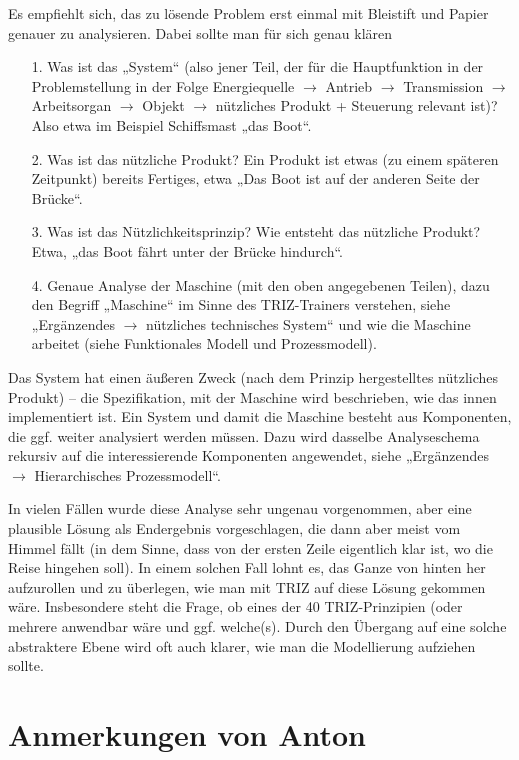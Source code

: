 \documentclass[11pt,a4paper]{article}
\begin{document}
Es empfiehlt sich, das zu lösende Problem erst einmal mit Bleistift und Papier
genauer zu analysieren. Dabei sollte man für sich genau klären
\begin{itemize}
\item[1.] Was ist das „System“ (also jener Teil, der für die Hauptfunktion in
  der Problemstellung in der Folge Energiequelle $\to$ Antrieb $\to$
  Transmission $\to$ Arbeitsorgan $\to$ Objekt $\to$ nützliches Produkt +
  Steuerung relevant ist)? Also etwa im Beispiel Schiffsmast „das Boot“.

\item[2.] Was ist das nützliche Produkt? Ein Produkt ist etwas (zu einem
  späteren Zeitpunkt) bereits Fertiges, etwa „Das Boot ist auf der anderen
  Seite der Brücke“.

\item[3.] Was ist das Nützlichkeitsprinzip? Wie entsteht das nützliche
  Produkt? Etwa, „das Boot fährt unter der Brücke hindurch“.

\item[4.] Genaue Analyse der Maschine (mit den oben angegebenen Teilen), dazu
  den Begriff „Maschine“ im Sinne des TRIZ-Trainers verstehen, siehe
  „Ergänzendes $\to$ nützliches technisches System“ und wie die Maschine
  arbeitet (siehe Funktionales Modell und Prozessmodell).
\end{itemize}
Das System hat einen äußeren Zweck (nach dem Prinzip hergestelltes nützliches
Produkt) -- die Spezifikation, mit der Maschine wird beschrieben, wie das
innen implementiert ist. Ein System und damit die Maschine besteht aus
Komponenten, die ggf. weiter analysiert werden müssen. Dazu wird dasselbe
Analyseschema rekursiv auf die interessierende Komponenten angewendet, siehe
„Ergänzendes $\to$ Hierarchisches Prozessmodell“.

In vielen Fällen wurde diese Analyse sehr ungenau vorgenommen, aber eine
plausible Lösung als Endergebnis vorgeschlagen, die dann aber meist vom Himmel
fällt (in dem Sinne, dass von der ersten Zeile eigentlich klar ist, wo die
Reise hingehen soll). In einem solchen Fall lohnt es, das Ganze von hinten her
aufzurollen und zu überlegen, wie man mit TRIZ auf diese Lösung gekommen
wäre. Insbesondere steht die Frage, ob eines der 40 TRIZ-Prinzipien (oder
mehrere anwendbar wäre und ggf. welche(s). Durch den Übergang auf eine solche
abstraktere Ebene wird oft auch klarer, wie man die Modellierung aufziehen
sollte.

\section{Anmerkungen von Anton}
\end{document}
